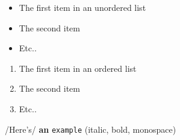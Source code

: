 \documentclass[a4paper]{article}
\begin{document}
\begin{itemize}
\item The first item in an unordered list

\item The second item

\item Etc..

\end{itemize}
\bigbreak
\begin{enumerate}
\item The first item in an ordered list

\item The second item

\item Etc..

\end{enumerate}
\bigbreak
/Here's/ \textbf{an} \texttt{example} (italic, bold, monospace)
\bigbreak
\end{document}

